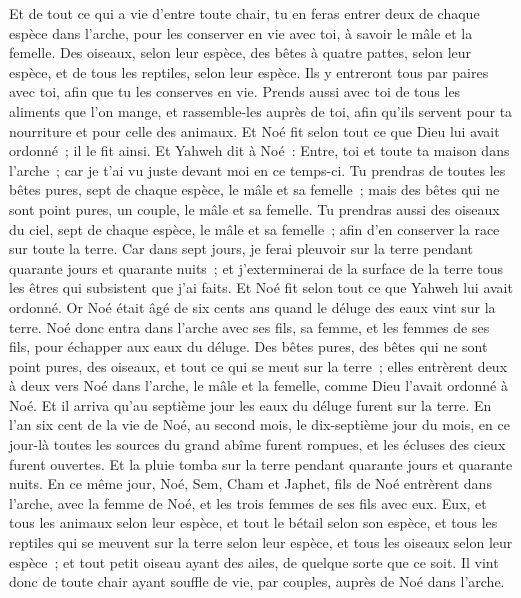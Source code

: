 \begin{multicols}{2}
Et de tout ce qui a vie d'entre toute chair, tu en feras entrer deux de chaque espèce dans l'arche, pour les conserver en vie avec toi, à savoir le mâle et la femelle.
Des oiseaux, selon leur espèce, des bêtes à quatre pattes, selon leur espèce, et de tous les reptiles, selon leur espèce. Ils y entreront tous par paires avec toi, afin que tu les conserves en vie.
Prends aussi avec toi de tous les aliments que l'on mange, et rassemble-les auprès de toi, afin qu'ils servent pour ta nourriture et pour celle des animaux.
Et Noé fit selon tout ce que Dieu lui avait ordonné~; il le fit ainsi.
\VerseOne{}Et Yahweh dit à Noé~: Entre, toi et toute ta maison dans l'arche~; car je t'ai vu juste devant moi en ce temps-ci. 
Tu prendras de toutes les bêtes pures, sept de chaque espèce, le mâle et sa femelle~; mais des bêtes qui ne sont point pures, un couple, le mâle et sa femelle.
Tu prendras aussi des oiseaux du ciel, sept de chaque espèce, le mâle et sa femelle~; afin d'en conserver la race sur toute la terre.
Car dans sept jours, je ferai pleuvoir sur la terre pendant quarante jours et quarante nuits~; et j'exterminerai de la surface de la terre tous les êtres qui subsistent que j'ai faits.
Et Noé fit selon tout ce que Yahweh lui avait ordonné.
Or Noé était âgé de six cents ans quand le déluge des eaux vint sur la terre.
Noé donc entra dans l'arche avec ses fils, sa femme, et les femmes de ses fils, pour échapper aux eaux du déluge.
Des bêtes pures, des bêtes qui ne sont point pures, des oiseaux, et tout ce qui se meut sur la terre~;
elles entrèrent deux à deux vers Noé dans l'arche, le mâle et la femelle, comme Dieu l'avait ordonné à Noé.
Et il arriva qu'au septième jour les eaux du déluge furent sur la terre.
En l'an six cent de la vie de Noé, au second mois, le dix-septième jour du mois, en ce jour-là toutes les sources du grand abîme furent rompues, et les écluses des cieux furent ouvertes.
Et la pluie tomba sur la terre pendant quarante jours et quarante nuits.
En ce même jour, Noé, Sem, Cham et Japhet, fils de Noé entrèrent dans l'arche, avec la femme de Noé, et les trois femmes de ses fils avec eux.
Eux, et tous les animaux selon leur espèce, et tout le bétail selon son espèce, et tous les reptiles qui se meuvent sur la terre selon leur espèce, et tous les oiseaux selon leur espèce~; et tout petit oiseau ayant des ailes, de quelque sorte que ce soit.
Il vint donc de toute chair ayant souffle de vie, par couples, auprès de Noé dans l'arche. 

\end{multicols}
